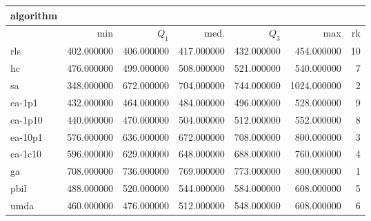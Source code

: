 \begin{tabular}{@{}l*{5}{>{{}}N{4}{0}}>{{}}N{2}{0}@{}}
\toprule
{algorithm} &  \\
\midrule
& {min} & {$Q_1$} & {med.} & {$Q_3$} & {max} & {rk}\\
\midrule
rls & 402.000000 & 406.000000 & 417.000000 & 432.000000 & 454.000000 & 10\\
hc & 476.000000 & 499.000000 & 508.000000 & 521.000000 & 540.000000 & 7\\
sa & 348.000000 & 672.000000 & 704.000000 & 744.000000 & {\color{blue}} 1024.000000 & 2\\
ea-1p1 & 432.000000 & 464.000000 & 484.000000 & 496.000000 & 528.000000 & 9\\
ea-1p10 & 440.000000 & 470.000000 & 504.000000 & 512.000000 & 552.000000 & 8\\
ea-10p1 & 576.000000 & 636.000000 & 672.000000 & 708.000000 & 800.000000 & 3\\
ea-1c10 & 596.000000 & 629.000000 & 648.000000 & 688.000000 & 760.000000 & 4\\
ga & {\color{blue}} 708.000000 & {\color{blue}} 736.000000 & {\color{blue}} 769.000000 & {\color{blue}} 773.000000 & 800.000000 & 1\\
pbil & 488.000000 & 520.000000 & 544.000000 & 584.000000 & 608.000000 & 5\\
umda & 460.000000 & 476.000000 & 512.000000 & 548.000000 & 608.000000 & 6\\
\bottomrule
\end{tabular}
